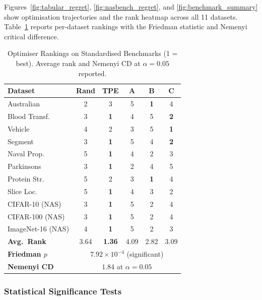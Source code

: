 \documentclass[11pt]{article}
\theoremstyle{definition}
\begin{document}
Figures~\ref{fig:tabular_regret}, \ref{fig:nasbench_regret}, and
\ref{fig:benchmark_summary} show optimisation trajectories and the
rank heatmap across all 11 datasets.
Table~\ref{tab:hpobench_rankings} reports per-dataset rankings with
the Friedman statistic and Nemenyi critical difference.

\begin{table}[H]
\centering
\caption{Optimiser Rankings on Standardised Benchmarks (1 = best).
         Average rank and Nemenyi CD at $\alpha=0.05$ reported.}
\label{tab:hpobench_rankings}
\begin{tabular}{lccccc}
\toprule
\textbf{Dataset} & \textbf{Rand} & \textbf{TPE}
                 & \textbf{A} & \textbf{B} & \textbf{C} \\
\midrule
Australian         & 2 & 3 & 5 & \textbf{1} & 4 \\
Blood Transf.      & 3 & \textbf{1} & 4 & 5 & \textbf{2} \\
Vehicle            & 4 & 2 & 3 & 5 & \textbf{1} \\
Segment            & 3 & \textbf{1} & 5 & 4 & \textbf{2} \\
\midrule
Naval Prop.        & 5 & \textbf{1} & 4 & 2 & 3 \\
Parkinsons         & 3 & \textbf{1} & 2 & 4 & 5 \\
Protein Str.       & 5 & 2 & 3 & \textbf{1} & 4 \\
Slice Loc.         & 5 & \textbf{1} & 4 & 3 & 2 \\
\midrule
CIFAR-10 (NAS)     & 3 & \textbf{1} & 5 & 2 & 4 \\
CIFAR-100 (NAS)    & 3 & \textbf{1} & 5 & 2 & 4 \\
ImageNet-16 (NAS)  & 4 & \textbf{1} & 5 & 2 & 3 \\
\midrule
\textbf{Avg.\ Rank} & 3.64 & \textbf{1.36} & 4.09 & 2.82 & 3.09 \\
\textbf{Friedman $p$} & \multicolumn{5}{c}{$7.92\times10^{-4}$ (significant)} \\
\textbf{Nemenyi CD} & \multicolumn{5}{c}{$1.84$ at $\alpha=0.05$} \\
\bottomrule
\end{tabular}
\end{table}

\subsubsection{Statistical Significance Tests}
\label{subsec:stats}
\end{document}
